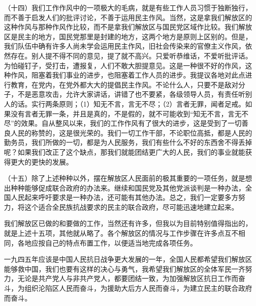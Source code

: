 （十四）我们工作作风中的一项极大的毛病，就是有些工作人员习惯于独断独行，而不善于启发人们的批评讨论，不善于运用民主作风。当然，这是拿我们解放区的这种作风与那种作风作比较，而不是拿我们解放区与国民党区域作比较。我们解放区是民主的地方，国民党那里是封建的地方，这两个地方是原则上区别的。但是，我们队伍中确有许多人尚未学会运用民主作风，旧社会传染来的官僚主义作风，依然存在。别人提不得不同的意见，提了就不高兴。只爱听恭维话，不爱听批评话。为怕碰钉子，受打击，遭报复，人们不敢大胆提意见。这是一种很不好的作风，这种作风，阻塞着我们事业的进步，也阻塞着工作人员的进步。我提议各地对此点进行教育，在党内，在党外都大大的提倡民主作风。不论什么人，只要不是敌对分子，不是恶意攻击，允许大家讲话，讲错了也不要紧，各级领导人员，有责任听别人的话。实行两条原则；（1）知无不言，言无不尽；（2）言者无罪，闻者足戒。如果没有言者无罪一条，并且是真的，不是假的，就不可能收到“知无不言，言无不尽”的效果。自从整风以来，我们的工作作风有了很大的进步，这是受到了一切善良人民的称赞的，这是很光荣的。我们一切工作干部，不论职位高抵，都是人民的勤务员，我们所做的一切，都是为人民服务，我们有些什么不好的东西舍不得丢掉呢？如果我们改正了这个缺点，那我们就能团结更广大的人民，我们的事业就能获得更大的更快的发展。

（十五）除了上述种种以外，摆在解放区人民面前的极其重要的一项任务，就是想出种种能够促成联合政府的办法来。继续和国民党及其他党派谈判是一种办法，全国人民起来呼吁要求是一种办法，还可能有其他办法。总之，我们一定要多方努力，将这个适合全民族抗战要求的民主的联合政府，尽可能迅速地建立起来。

我们解放区已做的和要做的工作，当然还有许多，但我以为目前特别值得指出的，就是上述十五项，其他就从略了。各个解放区的情况与工作步骤在许多点互不相同，各地应按自己的特点布置工作，以便适当地完成各项任务。

一九四五年应该是中国人民抗日战争更大发展的一年，全国人民都希望我们解放区能够救中国，我们也要有这样的决心与勇气，我希望我们解放区的全体军民一齐努力，无论是共产党人与非共产党人，都要团结一致，为加强解放区抗日工作而奋斗，为组织沦陷区人民而奋斗，为援助大后方人民而奋斗，为建立民主的联合政府而奋斗。

